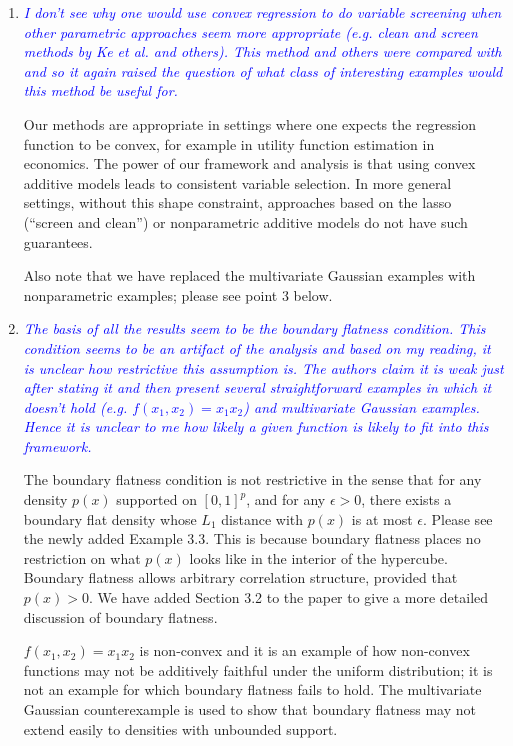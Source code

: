 \documentclass[pdftex,12pt]{article}
\def\rc#1{{\it\textcolor{blue}{#1}}\smallskip}
\begin{document}
\begin{enumerate}

\item \rc{I don't see why one would use convex regression to do
  variable screening when other parametric approaches seem more
  appropriate (e.g. clean and screen methods by Ke et al. and
  others). This method and others were compared with and so it again
  raised the question of what class of interesting examples would this
  method be useful for.}

Our methods are appropriate in settings where one expects the
regression function to be convex, for example in utility function
estimation in economics. The power of our framework and analysis is that
using convex additive models leads to consistent variable selection.
In more general settings, without this shape constraint,
approaches based on the lasso (``screen and clean'') or nonparametric 
additive models do not have such guarantees. 

Also note that we have replaced the multivariate Gaussian examples with 
nonparametric examples; please see point 3 below.


\item \rc{The basis of all the results seem to be the boundary flatness
condition. This condition seems to be an artifact of the analysis and
based on my reading, it is unclear how restrictive this assumption
is. The authors claim it is weak just after stating it and then
present several straightforward examples in which it doesn't hold
(e.g. $f(x_1,x_2)=x_1 x_2$) and multivariate Gaussian examples. Hence it is unclear to me how
likely a given function is likely to fit into this framework.}

The boundary flatness condition is not restrictive in the sense that
for any density $p(x)$ supported on $[0,1]^p$, and for any $\epsilon >
0$, there exists a boundary flat density whose $L_1$ distance with
$p(x)$ is at most $\epsilon$. Please see the newly added Example
3.3. This is because boundary flatness places no restriction on what
$p(x)$ looks like in the interior of the hypercube. Boundary flatness
allows arbitrary correlation structure, provided that $p(x) > 0$. We
have added Section 3.2 to the paper to give a more detailed discussion
of boundary flatness.

$f(x_1,x_2) = x_1 x_2$ is non-convex and it is an example of how
non-convex functions may not be additively faithful under the uniform
distribution; it is not an example for which boundary flatness fails
to hold. The multivariate Gaussian counterexample is used to show
that boundary flatness may not extend easily to densities with
unbounded support.


\end{enumerate}
\end{document}
